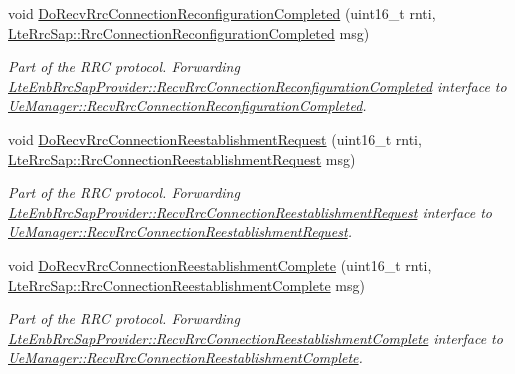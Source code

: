 \begin{DoxyCompactItemize}
void \hyperlink{classns3_1_1LteEnbRrc_aa25f7c5ee3ea60f4c53b2c9a5c323c56}{Do\+Recv\+Rrc\+Connection\+Reconfiguration\+Completed} (uint16\+\_\+t rnti, \hyperlink{structns3_1_1LteRrcSap_1_1RrcConnectionReconfigurationCompleted}{Lte\+Rrc\+Sap\+::\+Rrc\+Connection\+Reconfiguration\+Completed} msg)
\begin{DoxyCompactList}\small\item\em Part of the R\+RC protocol. Forwarding \hyperlink{classns3_1_1LteEnbRrcSapProvider_a551d1002a06181295debe624dfd1322b}{Lte\+Enb\+Rrc\+Sap\+Provider\+::\+Recv\+Rrc\+Connection\+Reconfiguration\+Completed} interface to \hyperlink{classns3_1_1UeManager_a767171084a3ea38162758d145b705e2a}{Ue\+Manager\+::\+Recv\+Rrc\+Connection\+Reconfiguration\+Completed}. \end{DoxyCompactList}\item 
void \hyperlink{classns3_1_1LteEnbRrc_ac042104d340786e0e2b84a1c1c46c957}{Do\+Recv\+Rrc\+Connection\+Reestablishment\+Request} (uint16\+\_\+t rnti, \hyperlink{structns3_1_1LteRrcSap_1_1RrcConnectionReestablishmentRequest}{Lte\+Rrc\+Sap\+::\+Rrc\+Connection\+Reestablishment\+Request} msg)
\begin{DoxyCompactList}\small\item\em Part of the R\+RC protocol. Forwarding \hyperlink{classns3_1_1LteEnbRrcSapProvider_a205d3d264d52fa434896589d48d8210e}{Lte\+Enb\+Rrc\+Sap\+Provider\+::\+Recv\+Rrc\+Connection\+Reestablishment\+Request} interface to \hyperlink{classns3_1_1UeManager_a02513c99e18c815fc58a05e4b135ecfa}{Ue\+Manager\+::\+Recv\+Rrc\+Connection\+Reestablishment\+Request}. \end{DoxyCompactList}\item 
void \hyperlink{classns3_1_1LteEnbRrc_a887fb569bcde2697903db31fa9e8bbdc}{Do\+Recv\+Rrc\+Connection\+Reestablishment\+Complete} (uint16\+\_\+t rnti, \hyperlink{structns3_1_1LteRrcSap_1_1RrcConnectionReestablishmentComplete}{Lte\+Rrc\+Sap\+::\+Rrc\+Connection\+Reestablishment\+Complete} msg)
\begin{DoxyCompactList}\small\item\em Part of the R\+RC protocol. Forwarding \hyperlink{classns3_1_1LteEnbRrcSapProvider_a45f6b371cbc613840cdc2c950768201f}{Lte\+Enb\+Rrc\+Sap\+Provider\+::\+Recv\+Rrc\+Connection\+Reestablishment\+Complete} interface to \hyperlink{classns3_1_1UeManager_ac37bbe0bc63e4fd32c098df8c2f531b8}{Ue\+Manager\+::\+Recv\+Rrc\+Connection\+Reestablishment\+Complete}. \end{DoxyCompactList}\item 

\end{DoxyCompactItemize}
